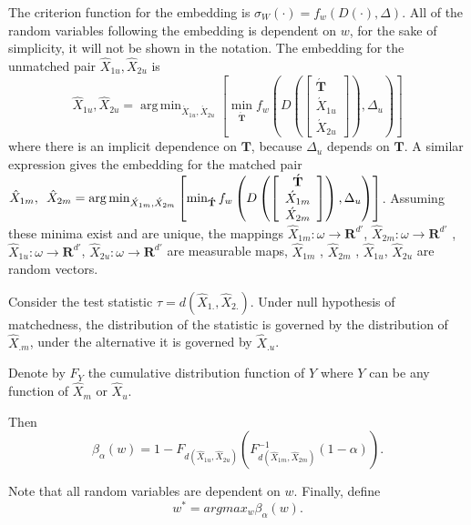 \documentclass[11pt]{article} %
\DeclareMathOperator*{\argmin}{arg\,min}
\begin{document}
 The criterion function for the embedding is $\sigma_W(\cdot) =f_w(D({\cdot}),\Delta)$. All of the random variables following the embedding is dependent on $w$, for the sake of simplicity, it will not be shown in the notation. The embedding for the unmatched pair ${\hat{X}_{1u},\hat{X}_{2u}}$  is 
 \[
{\hat{X}_{1u},\hat{X}_{2u}}
=\argmin_{\acute{X}_{1u}, \acute{X}_{2u}}\left[\min_{\mathbf{\acute{T}}}
{f_w\left(
D\left(
\left[
\begin{array}{c}
\acute{\mathbf{T}} \\
\acute{X}_{1u} \\
\acute{X}_{2u}
\end {array}
\right]
\right),
\Delta_{u}
\right)
}
\right]
\]
where there is an implicit dependence on $\mathbf{T}$, because $\Delta_{u}$ depends on $\mathbf{T}$. 
A similar expression gives the embedding for the matched pair  
${\hat{X}_{1m},\hspace{0.5em}\hat{X}_{2m}}=\argmin_{\acute{X}_{1m}, \acute{X}_{2m}}\left[\min_{\mathbf{\acute{T}}}
{f_w\left(
D\left(
\left[
\begin{array}{c}
\acute{\mathbf{T}} \\
\acute{X}_{1m} \\
\acute{X}_{2m}
\end {array}
\right]
\right),
\Delta_{u}
\right)
}
\right]$.
 Assuming these minima exist and are unique, the mappings $\hat{X}_{1m}:\omega\rightarrow \mathbf{R}^{d'}$,  $\hat{X}_{2m}:\omega\rightarrow \mathbf{R}^{d'}$ , $\hat{X}_{1u}:\omega\rightarrow \mathbf{R}^{d'}$, 
$\hat{X}_{2u}:\omega\rightarrow \mathbf{R}^{d'}$ are  measurable maps,  $\hat{X}_{1m}$ , $\hat{X}_{2m}$ , $\hat{X}_{1u}$, $\hat{X}_{2u}$ are random vectors. 

Consider the test statistic $\tau=d(\hat{X}_{1.},\hat{X}_{2.})$. Under null hypothesis of matchedness, the distribution of the statistic is governed by the distribution of $\hat{X}_{.m}$, under the alternative it is governed by  $\hat{X}_{.u}$.

Denote by $F_Y$ the   cumulative distribution function of  $Y$ where $Y$ can be  any function of $\hat{X}_m$ or $\hat{X}_u$. 



 Then $$\beta_{\alpha}\left( w\right)=1-F_{d(\hat{X}_{1u},\hat{X}_{2u})}(F_{d(\hat{X}_{1m},\hat{X}_{2m})}^{-1}(1-\alpha)).$$

 Note that all random variables are dependent on $w$. Finally, define $$w^{*}=argmax_w{\beta_{\alpha}\left( w\right)}. $$
\end{document}
